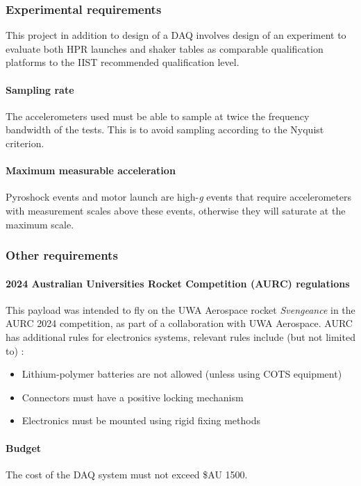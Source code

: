 \documentclass[a4paper,11pt]{article}
\begin{document}
\subsubsection{Experimental requirements}

This project in addition to design of a DAQ involves design of an experiment to evaluate both HPR launches and shaker tables as comparable qualification platforms to the IIST recommended qualification level.

\paragraph{Sampling rate} The accelerometers used must be able to sample at twice the frequency bandwidth of the tests. This is to avoid sampling according to the Nyquist criterion.

\paragraph{Maximum measurable acceleration} Pyroshock events and motor launch are high-\textit{g} events that require accelerometers with measurement scales above these events, otherwise they will saturate at the maximum scale.

\subsubsection{Other requirements}

\paragraph{2024 Australian Universities Rocket Competition (AURC) regulations} This payload was intended to fly on the UWA Aerospace rocket \textit{Svengeance} in the AURC 2024 competition, as part of a collaboration with UWA Aerospace. AURC has additional rules for electronics systems, relevant rules include (but not limited to) \cite{ayaa2023specifications}:
\begin{itemize}
  \item Lithium-polymer batteries are not allowed (unless using COTS equipment)
  \item Connectors must have a positive locking mechanism
  \item Electronics must be mounted using rigid fixing methods
\end{itemize}

\paragraph{Budget} The cost of the DAQ system must not exceed \$AU 1500.
\end{document}
